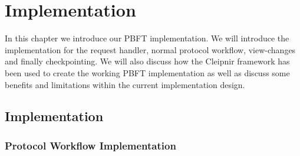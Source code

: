 \chapter{Implementation}
\label{chapter:Imp}
In this chapter we introduce our PBFT implementation. We will introduce the implementation for the request handler, normal protocol workflow, view-changes and finally checkpointing. We will also discuss how the Cleipnir framework has been used to create the working PBFT implementation as well as discuss some benefits and limitations within the current implementation design.



\section{Implementation}

\subsection{Protocol Workflow Implementation}

